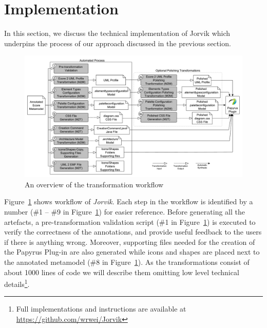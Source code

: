 \section{Implementation}
\label{sec:implementation}
In this section, we discuss the technical implementation of Jorvik which underpins the process of our approach discussed in the previous section. 

\begin{figure}[ht!]
	\centering
	\includegraphics[width=1\textwidth]{diagrams/transformationWorkflow.pdf}
	\caption[]{An overview of the transformation workflow}
	\label{fig:transformationWorkflow}
\end{figure}

Figure~\ref{fig:transformationWorkflow} shows workflow of \textit{Jorvik}. 
Each step in the workflow is identified by a number (\#1 -- \#9 in Figure~\ref{fig:transformationWorkflow}) for easier reference. 
Before generating all the artefacts, a pre-transformation validation script (\#1 in Figure~\ref{fig:transformationWorkflow}) is executed to verify the correctness of the annotations, and provide useful feedback to the users if there is anything wrong. 
Moreover, supporting files needed for the creation of the Papyrus Plug-in are also generated while icons and shapes are placed next to the annotated metamodel (\#8 in Figure~\ref{fig:transformationWorkflow}). 
As the transformations consist of about 1000 lines of code we will describe them omitting low level technical details\footnote{Full implementations and instructions are available at \url{https://github.com/wrwei/Jorvik}}. 


